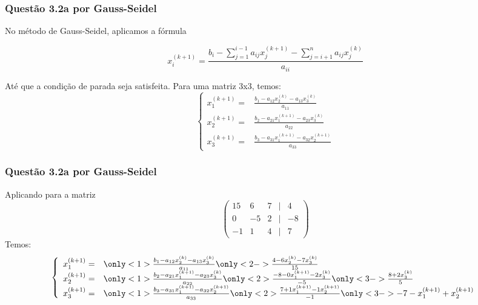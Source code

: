 \begin{frame}
\frametitle{Questão 3.2a por Gauss-Seidel}
No método de Gauss-Seidel, aplicamos a fórmula

\[
x_i^{(k+1)} = \frac{b_i %
  - \sum_{j = 1}^{i-1}a_{ij}x_j^{(k+1)}%
  - \sum_{j = i+1}^{n}a_{ij}x_j^{(k)}%
  }{a_{ii}}
\]

Até que a condição de parada seja satisfeita. 
%
Para uma matriz 3x3, temos:
\[
\left\{
\begin{array}{ll}
x_1^{(k+1)} = &\frac{b_1-a_{12}x_2^{(k)}-a_{13}x_3^{(k)}}{a_{11}}\\
x_2^{(k+1)} = &\frac{b_2-a_{21}x_1^{(k+1)}-a_{23}x_3^{(k)}}{a_{22}}\\
x_3^{(k+1)} = &\frac{b_3-a_{31}x_1^{(k+1)}-a_{32}x_2^{(k+1)}}{a_{33}}
\end{array}
\right.
\]
\end{frame}

\begin{frame}
\frametitle{Questão 3.2a por Gauss-Seidel}
Aplicando para a matriz
\[
\begin{pmatrix}
15 & 6 & 7 & | & 4\\
0 & -5 & 2 & | & -8\\
-1 & 1 & 4 & | & 7
\end{pmatrix}
\]
Temos:
\[
\left\{
\begin{array}{ll}
x_1^{(k+1)} = &
  \only<1>{\frac{b_1-a_{12}x_2^{(k)}-a_{13}x_3^{(k)}}{a_{11}}}
  \only<2->{\frac{4 -6x_2^{(k)} -7x_3^{(k)}}{15}}\\
%
x_2^{(k+1)} = &
  \only<1>{\frac{b_2-a_{21}x_1^{(k+1)}-a_{23}x_3^{(k)}}{a_{22}}}
  \only<2>{\frac{-8 -0x_1^{(k+1)} -2x_3^{(k)}}{-5}}
  \only<3->{\frac{8  +2x_3^{(k)}}{5}}\\
%
x_3^{(k+1)} = &
  \only<1>{\frac{b_3-a_{31}x_1^{(k+1)}-a_{32}x_2^{(k+1)}}{a_{33}}}
  \only<2>{\frac{7 +1x_1^{(k+1)} -1x_2^{(k+1)}}{-1}}
  \only<3->{-7 -x_1^{(k+1)} +x_2^{(k+1)}}
\end{array}
\right.
\]

\end{frame}

